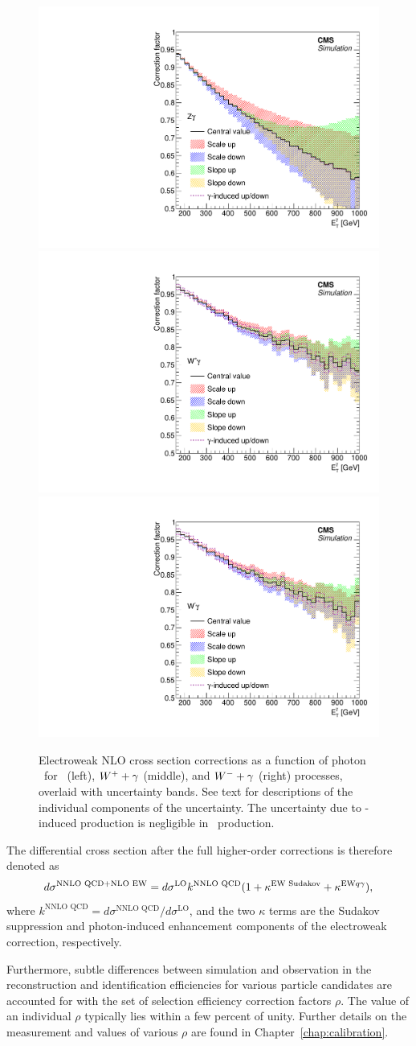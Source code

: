 \begin{figure}[htbp]
  \centering
  \includegraphics[width=0.32\linewidth]{Analysis/Figures/ewkcorr/zg.pdf}
  \includegraphics[width=0.32\linewidth]{Analysis/Figures/ewkcorr/wgplus.pdf}
  \includegraphics[width=0.32\linewidth]{Analysis/Figures/ewkcorr/wgminus.pdf}
  \caption{
    Electroweak NLO cross section corrections as a function of photon \pt\ for \zinvg\ (left), ${W}^{+}+\gamma$ (middle), and ${W}^{-}+\gamma$ (right) processes, overlaid with uncertainty bands. 
    See text for descriptions of the individual components of the uncertainty.
    The uncertainty due to \Pgg-induced production is negligible in \zinvg\ production.
  }
  \label{fig:ewk_correction}
\end{figure}

The differential cross section after the full higher-order corrections is therefore denoted as
\begin{equation}
  d\sigma^{\text{NNLO QCD}+\text{NLO EW}} = d\sigma^{\text{LO}} k^{\text{NNLO QCD}} (1 + \kappa^{\text{EW Sudakov}} + \kappa^{\text{EW} {q}\gamma}),
\end{equation}
where $k^{\text{NNLO QCD}} = d\sigma^{\text{NNLO QCD}} / d\sigma^{\text{LO}}$, and the two $\kappa$ terms are the Sudakov suppression and photon-induced enhancement components of the electroweak
correction, respectively.

Furthermore, subtle differences between simulation and observation in the reconstruction and identification efficiencies for various particle candidates are accounted for with the set of selection efficiency correction factors $\rho$. 
The value of an individual $\rho$ typically lies within a few percent of unity. 
Further details on the measurement and values of various $\rho$ are found in Chapter~\ref{chap:calibration}.


